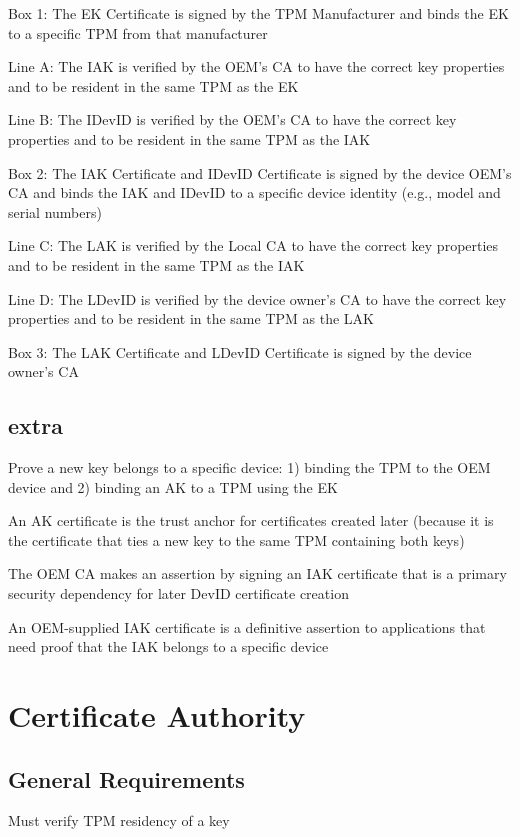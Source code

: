 \documentclass{article}
\begin{document}
Box 1: The EK Certificate is signed by the TPM Manufacturer and binds the EK to a specific TPM from that manufacturer

Line A: The IAK is verified by the OEM's CA to have the correct key properties and to be resident in the same TPM as the EK

Line B: The IDevID is verified by the OEM's CA to have the correct key properties and to be resident in the same TPM as the IAK

Box 2: The IAK Certificate and IDevID Certificate is signed by the device OEM's CA and binds the IAK and IDevID to a specific device identity (e.g., model and serial numbers)

Line C: The LAK is verified by the Local CA to have the correct key properties and to be resident in the same TPM as the IAK

Line D: The LDevID is verified by the device owner's CA to have the correct key properties and to be resident in the same TPM as the LAK

Box 3: The LAK Certificate and LDevID Certificate is signed by the device owner's CA

\subsection*{extra}

Prove a new key belongs to a specific device: 1) binding the TPM to the OEM device and 2) binding an AK to a TPM using the EK

An AK certificate is the trust anchor for certificates created later (because it is the certificate that ties a new key to the same TPM containing both keys)

The OEM CA makes an assertion by signing an IAK certificate that is a primary security dependency for later DevID certificate creation

An OEM-supplied IAK certificate is a definitive assertion to applications that need proof that the IAK belongs to a specific device





\section*{Certificate Authority}
\subsection*{General Requirements}
Must verify TPM residency of a key
\end{document}
